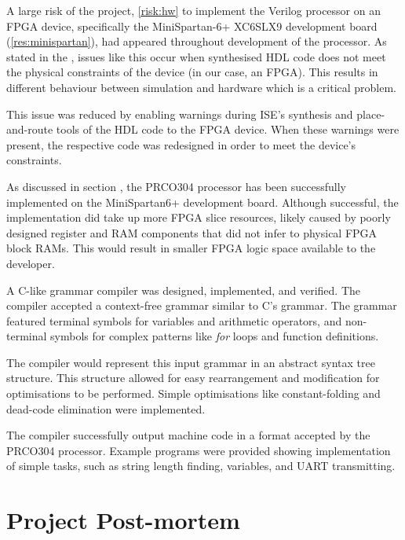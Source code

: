 \documentclass[11pt,a4paper]{report}
\newcommand{\scname}{PRCO304}
\begin{document}
\begin{description}[style=nextline]
\item[C3. Implementation of the soft-core processor design on real hardware (FPGA).]
A large risk of the project, \ref{risk:hw} to implement the Verilog processor on an FPGA device, specifically the MiniSpartan-6+ XC6SLX9 development board (\ref{res:minispartan}), had appeared throughout development of the processor. As stated in the {}, issues like this occur when synthesised HDL code does not meet the physical constraints of the device (in our case, an FPGA). This results in different behaviour between simulation and hardware which is a critical problem. 

This issue was reduced by enabling warnings during ISE's synthesis and place-and-route tools of the HDL code to the FPGA device. When these warnings were present, the respective code was redesigned in order to meet the device's constraints.

As discussed in section {}, the \scname{} processor has been successfully implemented on the MiniSpartan6+ development board. Although successful, the implementation did take up more FPGA slice resources, likely caused by poorly designed register and RAM components that did not infer to physical FPGA block RAMs. This would result in smaller FPGA logic space available to the developer.


\item[C4. To provide a high-level context-free code compiler to run user-code on the processor.]
A C-like grammar compiler was designed, implemented, and verified. The compiler accepted a context-free grammar similar to C's grammar. The grammar featured terminal symbols for variables and arithmetic operators, and non-terminal  symbols for complex patterns like \textit{for} loops and function definitions.

The compiler would represent this input grammar in an abstract syntax tree structure. This structure allowed for easy rearrangement and modification for optimisations to be performed. Simple optimisations like constant-folding and dead-code elimination were implemented.

The compiler successfully output machine code in a format accepted by the \scname{} processor. Example programs were provided showing implementation of simple tasks, such as string length finding, variables, and UART transmitting.
\end{description}

\newpage
\section{Project Post-mortem}
\end{document}

